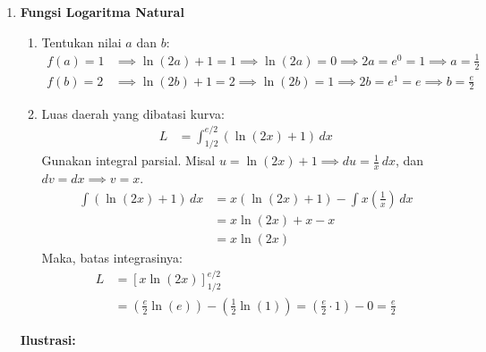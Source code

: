 \documentclass[a4paper,12pt]{article}
\begin{document}
\begin{enumerate}
  \item \textbf{Fungsi Logaritma Natural}
        \begin{enumerate}
          \item[(a)] Tentukan nilai $a$ dan $b$:
                \begin{align*}
                  f(a) = 1 & \implies \ln(2a) + 1 = 1 \implies \ln(2a) = 0 \implies 2a = e^0 = 1 \implies a = \frac{1}{2} \\
                  f(b) = 2 & \implies \ln(2b) + 1 = 2 \implies \ln(2b) = 1 \implies 2b = e^1 = e \implies b = \frac{e}{2}
                \end{align*}

          \item[(b)] Luas daerah yang dibatasi kurva:
                \begin{align*}
                  L & = \int_{1/2}^{e/2} (\ln(2x) + 1) \,dx
                \end{align*}
                Gunakan integral parsial. Misal $u = \ln(2x) + 1 \implies du = \frac{1}{x}\,dx$, dan $dv = dx \implies v = x$.
                \begin{align*}
                  \int (\ln(2x) + 1) \,dx & = x(\ln(2x) + 1) - \int x \left(\frac{1}{x}\right) \,dx \\
                                          & = x\ln(2x) + x - x \\
                                          & = x\ln(2x)
                \end{align*}
                Maka, batas integrasinya:
                \begin{align*}
                  L & = \left[ x\ln(2x) \right]_{1/2}^{e/2} \\
                    & = \left( \frac{e}{2}\ln(e) \right) - \left( \frac{1}{2}\ln(1) \right) = \left( \frac{e}{2} \cdot 1 \right) - 0 = \frac{e}{2}
                \end{align*}
        \end{enumerate}

        \textbf{Ilustrasi:}
        \begin{center}
        \end{center}


\end{enumerate}
\end{document}

